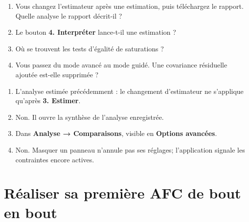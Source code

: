 \documentclass[
  french,
  11pt,
  a4paper,
  DIV=11,
  numbers=noendperiod]{scrreprt}
\providecommand{\tightlist}{%
  \setlength{\itemsep}{0pt}\setlength{\parskip}{0pt}}
\begin{document}
\begin{enumerate}
\def\labelenumi{\arabic{enumi}.}
\tightlist
\item
  Vous changez l'estimateur après une estimation, puis téléchargez le
  rapport. Quelle analyse le rapport décrit-il ?
\item
  Le bouton \textbf{4. Interpréter} lance-t-il une estimation ?
\item
  Où se trouvent les tests d'égalité de saturations ?
\item
  Vous passez du mode avancé au mode guidé. Une covariance résiduelle
  ajoutée est-elle supprimée ?
\end{enumerate}

\begin{tcolorbox}[enhanced jigsaw, arc=.35mm, bottomrule=.15mm, bottomtitle=1mm, breakable, colback=white, colbacktitle=quarto-callout-tip-color!10!white, colframe=quarto-callout-tip-color-frame, coltitle=black, left=2mm, leftrule=.75mm, opacityback=0, opacitybacktitle=0.6, rightrule=.15mm, title={Réponses}, titlerule=0mm, toprule=.15mm, toptitle=1mm]

\begin{enumerate}
\def\labelenumi{\arabic{enumi}.}
\tightlist
\item
  L'analyse estimée précédemment : le changement d'estimateur ne
  s'applique qu'après \textbf{3. Estimer}.
\item
  Non. Il ouvre la synthèse de l'analyse enregistrée.
\item
  Dans \textbf{Analyse → Comparaisons}, visible en \textbf{Options
  avancées}.
\item
  Non. Masquer un panneau n'annule pas ses réglages; l'application
  signale les contraintes encore actives.
\end{enumerate}

\end{tcolorbox}


\chapter{Réaliser sa première AFC de bout en bout}\label{sec-premiere}
\end{document}
